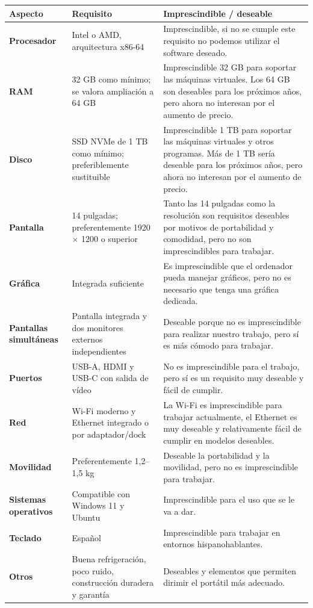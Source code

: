 \documentclass[11.5pt]{article}
\begin{document}
	\begin{tabular}{|l|p{4cm}|p{8.25cm}|}
		\hline
		\textbf{Aspecto} & \textbf{Requisito} & \textbf{Imprescindible / deseable} \\
		\hline
		\textbf{Procesador} & Intel o AMD, arquitectura x86-64 & Imprescindible, si no se cumple este requisito no podemos utilizar el software deseado. \\
		\hline
		\textbf{RAM} & 32 GB como mínimo; se valora ampliación a 64 GB & Imprescindible 32 GB para soportar las máquinas virtuales. Los 64 GB son deseables para los próximos años, pero ahora no interesan por el aumento de precio. \\
		\hline
		\textbf{Disco} & SSD NVMe de 1 TB como mínimo; preferiblemente sustituible & Imprescindible 1 TB para soportar las máquinas virtuales y otros programas. Más de 1 TB sería deseable para los próximos años, pero ahora no interesan por el aumento de precio. \\
		\hline
		\textbf{Pantalla} & 14 pulgadas; preferentemente 1920 \(\times\) 1200 o superior & Tanto las 14 pulgadas como la resolución son requisitos deseables por motivos de portabilidad y comodidad, pero no son imprescindibles para trabajar. \\
		\hline
		\textbf{Gráfica} & Integrada suficiente & Es imprescindible que el ordenador pueda manejar gráficos, pero no es necesario que tenga una gráfica dedicada. \\
		\hline
		\textbf{Pantallas simultáneas} & Pantalla integrada y dos monitores externos independientes & Deseable porque no es imprescindible para realizar nuestro trabajo, pero sí es más cómodo para trabajar. \\
		\hline
		\textbf{Puertos} & USB-A, HDMI y USB-C con salida de vídeo & No es imprescindible para el trabajo, pero sí es un requisito muy deseable y fácil de cumplir. \\
		\hline
		\textbf{Red} & Wi-Fi moderno y Ethernet integrado o por adaptador/dock & La Wi-Fi es imprescindible para trabajar actualmente, el Ethernet es muy deseable y relativamente fácil de cumplir en modelos deseables. \\
		\hline
		\textbf{Movilidad} & Preferentemente 1,2–1,5 kg & Deseable la portabilidad y la movilidad, pero no es imprescindible para trabajar. \\
		\hline
		\textbf{Sistemas operativos} & Compatible con Windows 11 y Ubuntu & Imprescindible para el uso que se le va a dar. \\
		\hline
		\textbf{Teclado} & Español & Imprescindible para trabajar en entornos hispanohablantes. \\
		\hline
		\textbf{Otros} & Buena refrigeración, poco ruido, construcción duradera y garantía & Deseables y elementos que permiten dirimir el portátil más adecuado. \\
		\hline
	\end{tabular}
	
\end{document}
